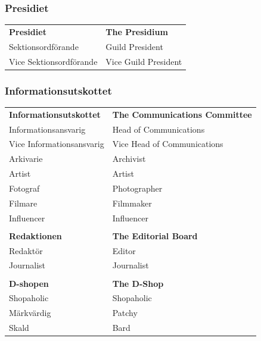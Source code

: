 \documentclass{dsekprotokoll}
\begin{document}
\subsubsection*{Presidiet}
\vspace{12pt}
\begin{center}
    \begin{tabular}{R{6.5cm}|L{6.5cm}}
        \textbf{Presidiet} & \textbf{The Presidium} \\
        Sektionsordförande & Guild President \\
        Vice Sektionsordförande & Vice Guild President
    \end{tabular}
\end{center}

\subsubsection*{Informationsutskottet}
\vspace{12pt}
\begin{center}
    \begin{tabular}{R{6.5cm}|L{6.5cm}}
        \textbf{Informationsutskottet} & \textbf{The Communications Committee}\\
        Informationsansvarig & Head of Communications\\
        Vice Informationsansvarig & Vice Head of Communications\\
        Arkivarie & Archivist\\
        Artist & Artist\\
        Fotograf & Photographer\\
        Filmare & Filmmaker\\
        Influencer & Influencer\\\\

        \textbf{Redaktionen} & \textbf{The Editorial Board}\\
        Redaktör & Editor\\
        Journalist & Journalist\\\\

        \textbf{D-shopen} & \textbf{The D-Shop}\\
        Shopaholic & Shopaholic\\
        Märkvärdig & Patchy\\
        Skald & Bard\\
    \end{tabular}
\end{center}
\end{document}
